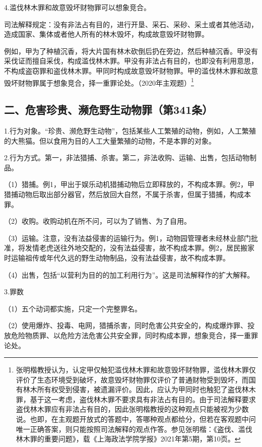 4.滥伐林木罪和故意毁坏财物罪可以想象竞合。

司法解释规定：没有非法占有目的，进行开垦、采石、采砂、采土或者其他活动，造成国家、集体或者他人所有的林木毁坏，构成故意毁坏财物罪。

例如，甲为了种植沉香，将大片国有林木砍倒后扔在旁边，然后种植沉香。甲没有采伐证而擅自采伐，构成滥伐林木罪。甲没有非法占有目的，也即没有利用意思，不构成盗窃罪和盗伐林木罪。甲同时构成故意毁坏财物罪。甲的滥伐林木罪和故意毁坏财物罪属于想象竞合，择一重罪论处。（2020年主观题）\footnote{张明楷教授认为，认定甲仅触犯滥伐林木罪和故意毁坏财物罪，滥伐林木罪仅评价了生态环境受到破坏，故意毁坏财物罪仅评价了普通财物受到毁坏，而国有林木所有权受到侵害，被遗漏评价。因此，应认为甲同时也触犯了盗伐林木罪，基于这一考虑，盗伐林木罪不要求具有非法占有目的。由于司法解释要求盗伐林木罪应有非法占有目的，因此张明楷教授的这种观点只能被视为少数说。也即，在主观题开放式的答题中，答哪种观点都给分，但若在客观题中问唯一正确答案，则只能按照司法解释的观点作答。参见张明楷：《盗伐、滥伐林木罪的重要问题》，载《上海政法学院学报》2021年第5期，第10页。}

\subsection*{二、危害珍贵、濒危野生动物罪（第341条）}

1.行为对象。“珍贵、濒危野生动物”，包括某些人工繁殖的动物，例如，人工繁殖的大熊猫。但以食用为目的人工大量繁殖的动物，不是本罪的对象。

2.行为方式。第一，非法猎捕、杀害。第二，非法收购、运输、出售，包括动物制品。

（1）猎捕。例1，甲出于娱乐动机猎捕动物后立即释放的，不构成本罪。例2，甲猎捕动物后取出部分器官，然后放回大自然，不属于杀害，但属于猎捕，构成本罪。

（2）收购。收购动机在所不问，可以为了销售、为了自用。

（3）运输。注意，没有法益侵害的运输行为。例1，动物园管理者未经林业部门批准，将发情老虎送往外地交配的，没有法益侵害，故不构成本罪。例2，居民搬家时运输祖传或年代久远的野生动物制品，没有法益侵害，故不构成本罪。

（4）出售，包括“以营利为目的的加工利用行为”。这是司法解释作的扩大解释。

3.罪数

（1）五个动词都实施，只定一个完整罪名。

（2）使用爆炸、投毒、电网，猎捕杀害，同时危害公共安全的，构成爆炸罪、投放危险物质罪、以危险方法危害公共安全罪，同时构成本罪，想象竞合，择一重罪论处。

